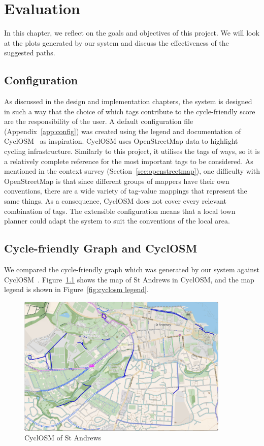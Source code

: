\documentclass[12pt,a4paper]{report}
\begin{document}
\chapter{Evaluation}\label{chapter:eval}
In this chapter, we reflect on the goals and objectives of this project. We will look at the plots generated by our system and discuss the effectiveness of the suggested paths.

\section{Configuration}
As discussed in the design and implementation chapters, the system is designed in such a way that the choice of which tags contribute to the cycle-friendly score are the responsibility of the user. A default configuration file (Appendix~\ref{app:config}) was created using the legend and documentation of CyclOSM~\cite{cycleOSM} as inspiration. CyclOSM uses OpenStreetMap data to highlight cycling infrastructure. Similarly to this project, it utilises the tags of ways, so it is a relatively complete reference for the most important tags to be considered. As mentioned in the context survey (Section~\ref{sec:openstreetmap}), one difficulty with OpenStreetMap is that since different groups of mappers have their own conventions, there are a wide variety of tag-value mappings that represent the same things. As a consequence, CyclOSM does not cover every relevant combination of tags. The extensible configuration means that a local town planner could adapt the system to suit the conventions of the local area.

\section{Cycle-friendly Graph and CyclOSM}\label{sec:eval_osm}
We compared the cycle-friendly graph which was generated by our system against CyclOSM~\cite{cycleOSM}. Figure~\ref{fig:cyclosm st andrews} shows the map of St Andrews in CyclOSM, and the map legend is shown in Figure~\ref{fig:cyclosm legend}.

\begin{figure}[ht!]
    \centering
    \includegraphics[width=0.9\textwidth]{diss_images/eval/cyclosm_st_andrews.png}
    \caption{CyclOSM of St Andrews}
    \label{fig:cyclosm st andrews}
\end{figure}
\end{document}
